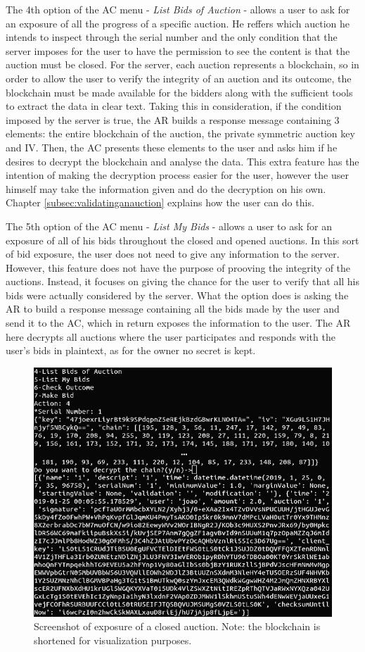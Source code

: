 \documentclass[a4paper]{article}
\begin{document}
The 4th option of the AC menu - \emph{List Bids of Auction} - allows a user to ask for an exposure of all the progress of a specific auction.
He reffers which auction he intends to inspect through the serial number and the only condition that the server imposes for the user to have the permission to see the content is that the auction must be closed.
For the server, each auction represents a blockchain, so in order to allow the user to verify the integrity of an auction and its outcome, the blockchain must be made available for the bidders along with the sufficient tools to extract the data in clear text.
Taking this in consideration, if the condition imposed by the server is true, the AR builds a response message containing 3 elements: the entire blockchain of the auction, the private symmetric auction key and IV.
Then, the AC presents these elements to the user and asks him if he desires to decrypt the blockchain and analyse the data.
This extra feature has the intention of making the decryption process easier for the user, however the user himself may take the information given and do the decryption on his own.
Chapter \ref{subsec:validatinganauction} explains how the user can do this.

The 5th option of the AC menu - \emph{List My Bids} - allows a user to ask for an exposure of all of his bids throughout the closed and opened auctions.
In this sort of bid exposure, the user does not need to give any information to the server.
However, this feature does not have the purpose of prooving the integrity of the auctions. 
Instead, it focuses on giving the chance for the user to verify that all his bids were actually considered by the server.
What the option does is asking the AR to build a response message containing all the bids made by the user and send it to the AC, which in return exposes the information to the user.
The AR here decrypts all auctions where the user participates and responds with the user's bids in plaintext, as for the owner no secret is kept.

\begin{figure}[H]
\centering
\includegraphics[width=0.7\linewidth]{BE.png}
\caption{Screenshot of exposure of a closed auction. Note: the blockchain is shortened for visualization purposes.}
\label{fig:be}
\end{figure}
\end{document}
